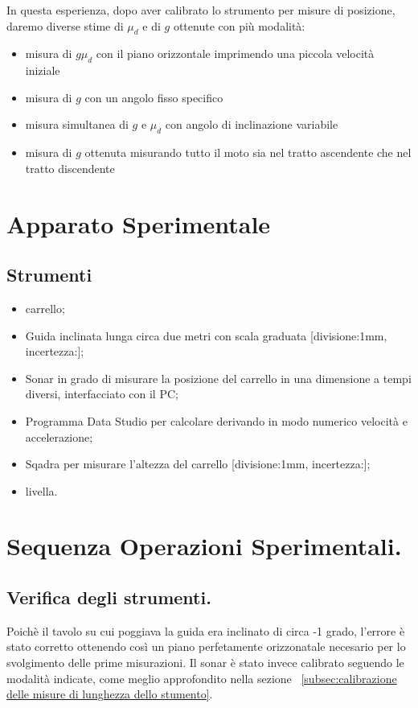 \documentclass[10pt,oneside,a4paper]{article}
\begin{document}
In questa esperienza, dopo aver calibrato lo strumento per misure di posizione, daremo diverse stime di $\mu_d$ e di $g$ ottenute con più modalità:

\begin{itemize}
	\item misura di $g\mu_d$ con il piano orizzontale imprimendo una piccola velocità iniziale 
	\item misura di $g$ con un angolo fisso specifico 
	\item misura simultanea di $g$ e $\mu_d$ con angolo di inclinazione variabile 
	\item misura di $g$ ottenuta misurando tutto il moto sia nel tratto ascendente che nel tratto discendente
\end{itemize}
	
\section{Apparato Sperimentale}
	
\subsection{Strumenti}
\label{subsec:strumenti}
\begin{itemize}
\item carrello;
\item Guida inclinata lunga circa due metri con scala graduata [divisione:1mm, incertezza:];
\item Sonar in grado di misurare la posizione del carrello in una dimensione a tempi diversi, interfacciato con il PC;
\item Programma Data Studio per calcolare derivando in modo numerico velocità e accelerazione;
\item Sqadra per misurare l'altezza del carrello [divisione:1mm, incertezza:];
\item livella.
\end{itemize}

\section{Sequenza Operazioni Sperimentali.}

\subsection{Verifica degli strumenti.}
\label{subsec:verifica}
Poichè il tavolo su cui poggiava la guida era inclinato di circa -1 grado, l'errore è stato corretto ottenendo così un piano perfetamente orizzonatale necesario per lo svolgimento delle prime misurazioni. Il sonar è stato invece calibrato seguendo le modalità indicate, come meglio approfondito nella sezione ~\ref{subsec:calibrazione delle misure di lunghezza dello stumento}.
\end{document}
